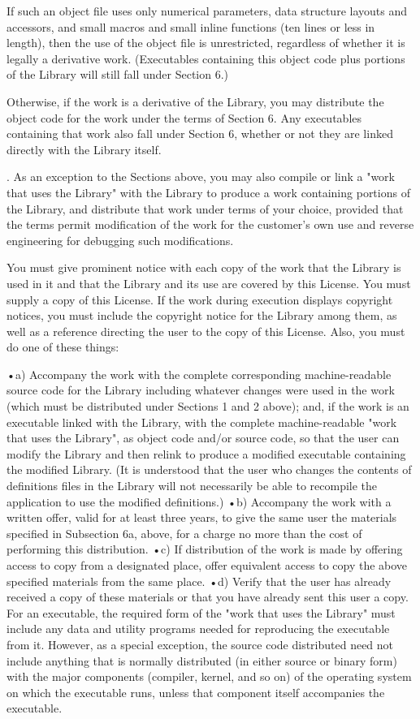If such an object file uses only numerical parameters, data structure layouts and accessors, and small macros and small inline functions (ten lines or less in length), then the use of the object file is unrestricted, regardless of whether it is legally a derivative work. (Executables containing this object code plus portions of the Library will still fall under Section 6.) 

Otherwise, if the work is a derivative of the Library, you may distribute the object code for the work under the terms of Section 6. Any executables containing that work also fall under Section 6, whether or not they are linked directly with the Library itself. 

. As an exception to the Sections above, you may also compile or link a "work that uses the Library" with the Library to produce a work containing portions of the Library, and distribute that work under terms of your choice, provided that the terms permit modification of the work for the customer's own use and reverse engineering for debugging such modifications. 

You must give prominent notice with each copy of the work that the Library is used in it and that the Library and its use are covered by this License. You must supply a copy of this License. If the work during execution displays copyright notices, you must include the copyright notice for the Library among them, as well as a reference directing the user to the copy of this License. Also, you must do one of these things: 

•a) Accompany the work with the complete corresponding machine-readable source code for the Library including whatever changes were used in the work (which must be distributed under Sections 1 and 2 above); and, if the work is an executable linked with the Library, with the complete machine-readable "work that uses the Library", as object code and/or source code, so that the user can modify the Library and then relink to produce a modified executable containing the modified Library. (It is understood that the user who changes the contents of definitions files in the Library will not necessarily be able to recompile the application to use the modified definitions.) 
•b) Accompany the work with a written offer, valid for at least three years, to give the same user the materials specified in Subsection 6a, above, for a charge no more than the cost of performing this distribution. 
•c) If distribution of the work is made by offering access to copy from a designated place, offer equivalent access to copy the above specified materials from the same place. 
•d) Verify that the user has already received a copy of these materials or that you have already sent this user a copy. 
For an executable, the required form of the "work that uses the Library" must include any data and utility programs needed for reproducing the executable from it. However, as a special exception, the source code distributed need not include anything that is normally distributed (in either source or binary form) with the major components (compiler, kernel, and so on) of the operating system on which the executable runs, unless that component itself accompanies the executable. 

